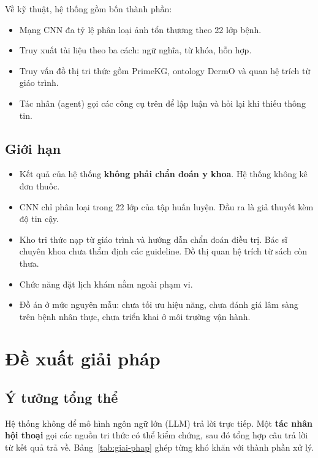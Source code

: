 Về kỹ thuật, hệ thống gồm bốn thành phần:
\begin{itemize}
  \item Mạng CNN đa tỷ lệ phân loại ảnh tổn thương theo 22 lớp bệnh.
  \item Truy xuất tài liệu theo ba cách: ngữ nghĩa, từ khóa, hỗn hợp.
  \item Truy vấn đồ thị tri thức gồm PrimeKG, ontology DermO và quan hệ trích từ giáo trình.
  \item Tác nhân (agent) gọi các công cụ trên để lập luận và hỏi lại khi thiếu thông tin.
\end{itemize}

\subsection{Giới hạn}

\begin{itemize}
  \item Kết quả của hệ thống \textbf{không phải chẩn đoán y khoa}. Hệ thống không kê đơn thuốc.
  \item CNN chỉ phân loại trong 22 lớp của tập huấn luyện. Đầu ra là giả thuyết kèm độ tin cậy.
  \item Kho tri thức nạp từ giáo trình và hướng dẫn chẩn đoán điều trị. Bác sĩ chuyên khoa chưa thẩm định các guideline. Đồ thị quan hệ trích từ sách còn thưa.
  \item Chức năng đặt lịch khám nằm ngoài phạm vi.
  \item Đồ án ở mức nguyên mẫu: chưa tối ưu hiệu năng, chưa đánh giá lâm sàng trên bệnh nhân thực, chưa triển khai ở môi trường vận hành.
\end{itemize}

\section{Đề xuất giải pháp}

\subsection{Ý tưởng tổng thể}

Hệ thống không để mô hình ngôn ngữ lớn (LLM) trả lời trực tiếp. Một \textbf{tác nhân hội thoại} gọi các nguồn tri thức có thể kiểm chứng, sau đó tổng hợp câu trả lời từ kết quả trả về. Bảng~\ref{tab:giai-phap} ghép từng khó khăn với thành phần xử lý.

